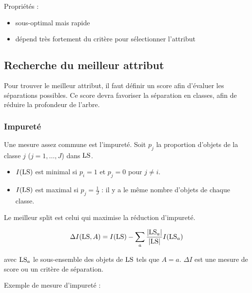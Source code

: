 	Propriétés : 
	
	\begin{itemize}
		\item sous-optimal mais rapide
		\item dépend très fortement du critère pour sélectionner l'attribut
	\end{itemize}
	
	\subsection{Recherche du meilleur attribut}
	
	Pour trouver le meilleur attribut, il faut définir un score afin d'évaluer les séparations possibles. Ce score devra favoriser la séparation en classes, afin de réduire la profondeur de l'arbre.
	
	
		\subsubsection{Impureté}
		
		Une mesure assez commune est l'impureté. Soit $p_j$ la proportion d'objets de la classe $j$ ($j = 1, \dots , J$) dans $\text{LS}$.
		
		\begin{itemize}
			\item $I(\text{LS})$ est minimal si $p_i = 1$ et $p_j = 0$ pour $j \neq i$.
			\item $I(\text{LS})$ est maximal si $p_j = \frac{1}{J}$ : il y a le même nombre d'objets de chaque classe.
		\end{itemize}
		
		Le meilleur split est celui qui maximise la réduction d'impureté.
		
		$$\Delta I(\text{LS}, A) = I(\text{LS}) - \sum_a \frac{\vert \text{LS}_a \vert}{\vert \text{LS} \vert} I(\text{LS}_a)$$
		
		avec $\text{LS}_a$ le sous-ensemble des objets de $\text{LS}$ tels que $A = a$. $\Delta I$ est une mesure de score ou un critère de séparation.
		
		
		
		Exemple de mesure d'impureté :
		
